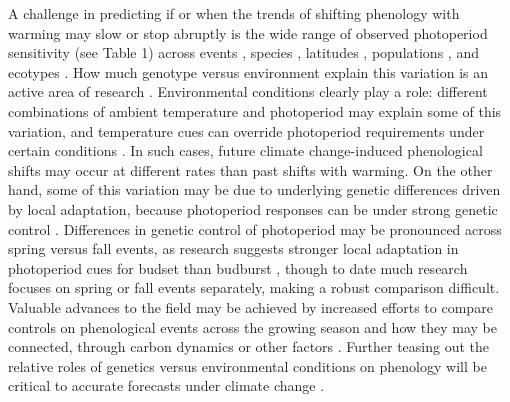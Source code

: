 \documentclass{article}
\begin{document}
 \par A challenge in predicting if or when the trends of shifting phenology with warming may slow or stop abruptly is the wide range of observed photoperiod sensitivity (see Table 1) across events \citep[e.g., spring versus fall events][]{mimura2010}, species \citep{flynn2018,zohner2016,Sanz-Perez:2009aa}, latitudes \citep{ettinger2020,Partanen:2005aa,johnsen1996}, populations \citep{gauzere2017,saikkonen2012,Caffarra:2011b,bradshaw2007,Vihera-Aarnio:2006aa}, and ecotypes \citep{Howe:1995aa}. How much genotype versus environment explain this variation is an active area of research \citep[e.g.,][]{frejaville2019,franks2014,gould2010,mimura2010}. Environmental conditions clearly play a role: different combinations of ambient temperature and photoperiod may explain some of this variation, and temperature cues can override photoperiod requirements under certain conditions \citep [e.g.,][] {tanino2010}. In such cases, future climate change-induced phenological shifts may occur at different rates than past shifts with warming. On the other hand, some of this variation may be due to underlying genetic differences driven by local adaptation, because photoperiod responses can be under strong genetic control \citep[][see also Boxes 1, 2]{keller2011,weih2004,bradshaw1995}. Differences in genetic control of photoperiod may be pronounced across spring versus fall events, as research suggests stronger local adaptation in photoperiod cues for budset than budburst \citep{mimura2010}, though to date much research focuses on spring or fall events separately, making a robust comparison difficult. Valuable advances to the field may be achieved by increased efforts to compare controls on phenological events across the growing season and how they may be connected, through carbon dynamics or other factors \citep{zani2020,ettinger2018}. Further teasing out the relative roles of genetics versus environmental conditions on phenology will be critical to accurate forecasts under climate change \citep{pau2011}.
\end{document}
